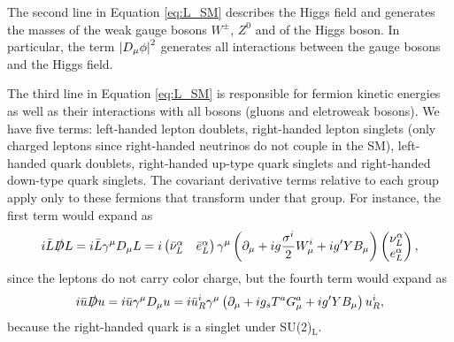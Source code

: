 The second line in Equation \eqref{eq:L_SM} describes the Higgs field and generates the masses of the weak gauge bosons $W^{\pm}$, $Z^{0}$ and of the Higgs boson. In particular, the term $\left\lvert D_{\mu}\phi\right\rvert^2$ generates all interactions between the gauge bosons and the Higgs field.

The third line in Equation \eqref{eq:L_SM} is responsible for fermion kinetic energies as well as their interactions with all bosons (gluons and eletroweak bosons). We have five terms: left-handed lepton doublets, right-handed lepton singlets (only charged leptons since right-handed neutrinos do not couple in the SM), left-handed quark doublets, right-handed up-type quark singlets and right-handed down-type quark singlets. The covariant derivative terms relative to each group apply only to these fermions that transform under that group. For instance, the first term would expand as
\begin{equation*}
    i\bar{L}\slashed{D} L = i\bar{L}\gamma^{\mu}D_\mu L = i
    \begin{pmatrix}
        \bar{\nu}_{L}^{\alpha} & \bar{e}_{L}^{\alpha}
    \end{pmatrix}
    \gamma^{\mu}\left(\partial_\mu + ig\frac{\sigma^{i}}{2}W_\mu^{i} + ig'YB_\mu\right)
    \begin{pmatrix}
        \nu_{L}^{\alpha}\\
        e_{L}^{\alpha}
    \end{pmatrix},
\end{equation*}
since the leptons do not carry color charge, but the fourth term would expand as
\begin{equation*}
    i\bar{u}\slashed{D} u = i\bar{u}\gamma^{\mu}D_\mu u = i \bar{u}_{R}^{i}
    \gamma^{\mu}\left(\partial_\mu + ig_{s}T^{a}G_\mu^{a} + ig'YB_\mu\right) u_{R}^{i},
\end{equation*}
because the right-handed quark is a singlet under SU(2)$_{\text{L}}$.


